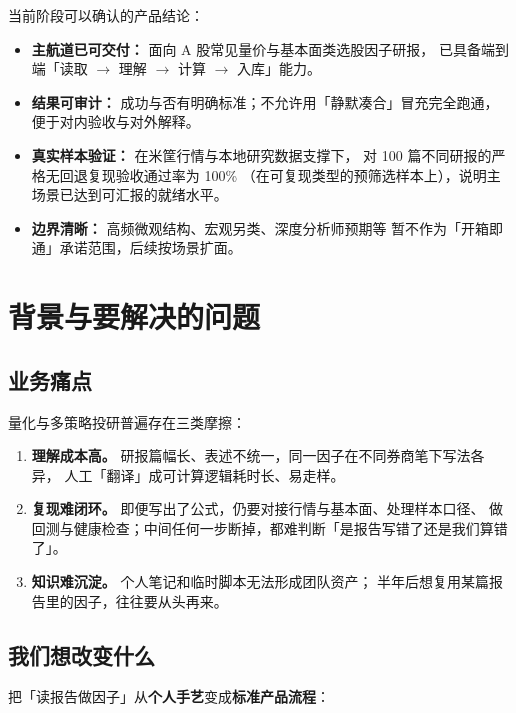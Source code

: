 \documentclass[UTF8,a4paper,11pt]{ctexart}
\begin{document}
当前阶段可以确认的产品结论：

\begin{itemize}
  \item \textbf{主航道已可交付：} 面向 A 股常见量价与基本面类选股因子研报，
        已具备端到端「读取 $\rightarrow$ 理解 $\rightarrow$ 计算 $\rightarrow$ 入库」能力。
  \item \textbf{结果可审计：} 成功与否有明确标准；不允许用「静默凑合」冒充完全跑通，
        便于对内验收与对外解释。
  \item \textbf{真实样本验证：} 在米筐行情与本地研究数据支撑下，
        对 100 篇不同研报的严格无回退复现验收通过率为 100\%
        （在可复现类型的预筛选样本上），说明主场景已达到可汇报的就绪水平。
  \item \textbf{边界清晰：} 高频微观结构、宏观另类、深度分析师预期等
        暂不作为「开箱即通」承诺范围，后续按场景扩面。
\end{itemize}

\section{背景与要解决的问题}

\subsection{业务痛点}

量化与多策略投研普遍存在三类摩擦：

\begin{enumerate}
  \item \textbf{理解成本高。} 研报篇幅长、表述不统一，同一因子在不同券商笔下写法各异，
        人工「翻译」成可计算逻辑耗时长、易走样。
  \item \textbf{复现难闭环。} 即便写出了公式，仍要对接行情与基本面、处理样本口径、
        做回测与健康检查；中间任何一步断掉，都难判断「是报告写错了还是我们算错了」。
  \item \textbf{知识难沉淀。} 个人笔记和临时脚本无法形成团队资产；
        半年后想复用某篇报告里的因子，往往要从头再来。
\end{enumerate}

\subsection{我们想改变什么}

把「读报告做因子」从\textbf{个人手艺}变成\textbf{标准产品流程}：
\end{document}
